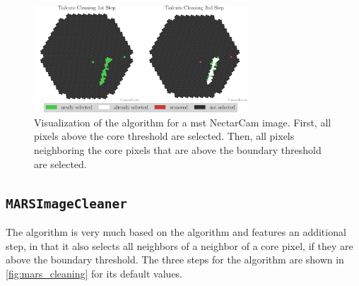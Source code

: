 \begin{figure}
    \centering
    \includegraphics[height=4cm]{plots/cleaner_steps/tailcuts.pdf}
    \caption{Visualization of the \tailcuts{} algorithm for a \gls{mst} NectarCam image. First, all
    pixels above the core threshold are selected. Then, all pixels neighboring the core
    pixels that are above the boundary threshold are selected.}
    \label{fig:tailcuts_clean}
\end{figure}

\subsection*{\texttt{MARSImageCleaner}}
\vspace{-0.5cm}
The \mars{} algorithm \cite{mars} is very much based on the \tailcuts{}
algorithm and features an additional step, in that it also selects all neighbors of a neighbor of a
core pixel, if they are above the boundary threshold. The three steps for the \mars{} algorithm
are shown in \autoref{fig:mars_cleaning} for its default values.

